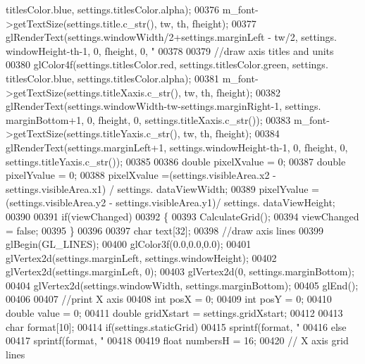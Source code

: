 \begin{DoxyCode}
{      titlesColor.blue, settings.titlesColor.alpha);
00376     m_font->getTextSize(settings.title.c\_str(), tw, th, fheight);
00377     glRenderText(settings.windowWidth/2+settings.marginLeft - tw/2, settings.
      windowHeight-th-1, 0, fheight, 0, \textcolor{stringliteral}{"%
00378 
00379     \textcolor{comment}{//draw axis titles and units}
00380     glColor4f(settings.titlesColor.red, settings.titlesColor.green, settings.
      titlesColor.blue, settings.titlesColor.alpha);
00381     m_font->getTextSize(settings.titleXaxis.c\_str(), tw, th, fheight);
00382     glRenderText(settings.windowWidth-tw-settings.marginRight-1, settings.
      marginBottom+1, 0, fheight, 0, settings.titleXaxis.c\_str());
00383     m_font->getTextSize(settings.titleYaxis.c\_str(), tw, th, fheight);
00384     glRenderText(settings.marginLeft+1, settings.windowHeight-th-1, 0, fheight, 0, 
      settings.titleYaxis.c\_str());
00385 
00386     \textcolor{keywordtype}{double} pixelXvalue = 0;
00387     \textcolor{keywordtype}{double} pixelYvalue = 0;
00388     pixelXvalue =(settings.visibleArea.x2 - settings.visibleArea.x1) / settings.
      dataViewWidth;
00389     pixelYvalue = (settings.visibleArea.y2 - settings.visibleArea.y1)/  settings.
      dataViewHeight;
00390 
00391     \textcolor{keywordflow}{if}(viewChanged)
00392     \{
00393         CalculateGrid();
00394         viewChanged = \textcolor{keyword}{false};
00395     \}
00396 
00397     \textcolor{keywordtype}{char} text[32];
00398     \textcolor{comment}{//draw axis lines}
00399     glBegin(GL_LINES);
00400         glColor3f(0.0,0.0,0.0);
00401         glVertex2d(settings.marginLeft, settings.windowHeight);
00402         glVertex2d(settings.marginLeft, 0);
00403         glVertex2d(0, settings.marginBottom);
00404         glVertex2d(settings.windowWidth, settings.marginBottom);
00405     glEnd();
00406 
00407     \textcolor{comment}{//print X axis}
00408     \textcolor{keywordtype}{int} posX = 0;
00409     \textcolor{keywordtype}{int} posY = 0;
00410     \textcolor{keywordtype}{double} value = 0;
00411     \textcolor{keywordtype}{double} gridXstart = settings.gridXstart;
00412 
00413     \textcolor{keywordtype}{char} format[10];
00414     \textcolor{keywordflow}{if}(settings.staticGrid)
00415           sprintf(format, \textcolor{stringliteral}{"%
00416     \textcolor{keywordflow}{else}
00417           sprintf(format, \textcolor{stringliteral}{"%
00418 
00419     \textcolor{keywordtype}{float} numbersH = 16;
00420     \textcolor{comment}{// X axis grid lines}
}}}}
\end{DoxyCode}
